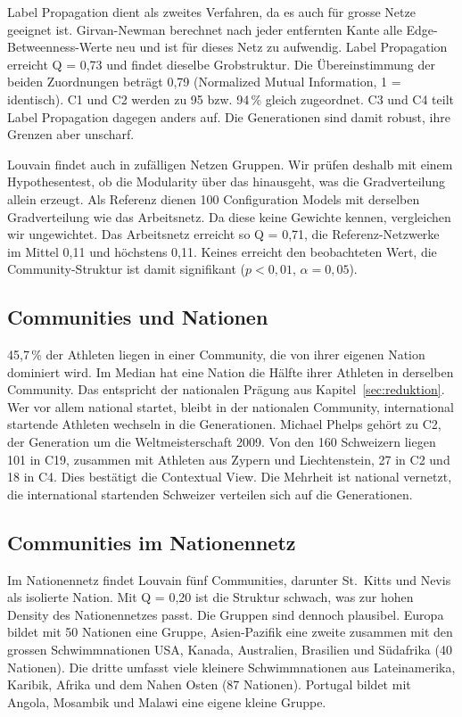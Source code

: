 Label Propagation dient als zweites Verfahren, da es auch für grosse Netze
geeignet ist. Girvan-Newman berechnet nach jeder entfernten Kante alle
Edge-Betweenness-Werte neu und ist für dieses Netz zu aufwendig. Label
Propagation erreicht Q = 0,73 und findet dieselbe Grobstruktur. Die
Übereinstimmung der beiden Zuordnungen beträgt 0,79 (Normalized Mutual
Information, 1 = identisch). C1 und C2 werden zu 95 bzw. 94\,\% gleich
zugeordnet. C3 und C4 teilt Label Propagation dagegen anders auf. Die
Generationen sind damit robust, ihre Grenzen aber unscharf.

Louvain findet auch in zufälligen Netzen Gruppen. Wir prüfen deshalb mit
einem Hypothesentest, ob die Modularity über das hinausgeht, was die
Gradverteilung allein erzeugt. Als Referenz dienen 100 Configuration Models
mit derselben Gradverteilung wie das Arbeitsnetz. Da diese keine Gewichte
kennen, vergleichen wir ungewichtet. Das Arbeitsnetz erreicht so
Q = 0,71, die Referenz-Netzwerke im Mittel 0,11 und höchstens 0,11. Keines
erreicht den beobachteten Wert, die Community-Struktur ist damit signifikant
($p < 0{,}01$, $\alpha = 0{,}05$).

\subsection{Communities und Nationen}
45,7\,\% der Athleten liegen in einer Community, die von ihrer eigenen
Nation dominiert wird. Im Median hat eine Nation die Hälfte ihrer Athleten
in derselben Community. Das entspricht der nationalen Prägung aus
Kapitel~\ref{sec:reduktion}. Wer vor allem national startet, bleibt in der
nationalen Community, international startende Athleten wechseln in die
Generationen. Michael Phelps gehört zu C2, der Generation um die
Weltmeisterschaft 2009. Von den 160 Schweizern liegen 101 in C19, zusammen
mit Athleten aus Zypern und Liechtenstein, 27 in C2 und 18 in C4. Dies
bestätigt die Contextual View. Die Mehrheit ist national vernetzt, die
international startenden Schweizer verteilen sich auf die Generationen.

\subsection{Communities im Nationennetz}
Im Nationennetz findet Louvain fünf Communities, darunter St.\ Kitts und
Nevis als isolierte Nation. Mit Q = 0,20 ist die Struktur schwach, was zur
hohen Density des Nationennetzes passt. Die Gruppen sind dennoch plausibel.
Europa bildet mit 50 Nationen eine Gruppe, Asien-Pazifik eine zweite
zusammen mit den grossen Schwimmnationen USA, Kanada, Australien, Brasilien
und Südafrika (40 Nationen). Die dritte umfasst viele kleinere
Schwimmnationen aus Lateinamerika, Karibik, Afrika und dem Nahen Osten
(87 Nationen). Portugal bildet mit
Angola, Mosambik und Malawi eine eigene kleine Gruppe.
